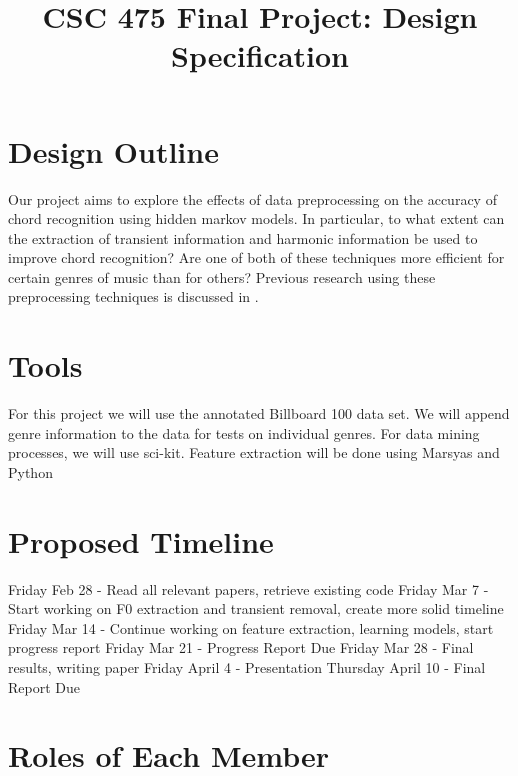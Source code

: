 \documentclass{article}
\title{CSC 475 Final Project: Design Specification}
\begin{document}
%
\maketitle
%

\section{Design Outline}\label{sec:desoutline}
Our project aims to explore the effects of data preprocessing on the accuracy
of chord recognition using hidden markov models. In particular, to what extent
can the extraction of transient information and harmonic information be used to
improve chord recognition? Are one of both of these techniques more efficient
for certain genres of music than for others? Previous research using these
preprocessing techniques is discussed in \cite{McVicar:00}.

\section{Tools}\label{sec:tools}

For this project we will use the annotated Billboard 100 data set. We will
append genre information to the data for tests on individual genres. For data
mining processes, we will use sci-kit. Feature extraction will be done using
Marsyas and Python

\section{Proposed Timeline}\label{sec:timeline}

Friday Feb 28 - Read all relevant papers, retrieve existing code \newline
Friday Mar 7 - Start working on F0 extraction and transient removal, create
more solid timeline \newline Friday Mar 14 - Continue working on feature
extraction, learning models, start progress report \newline Friday Mar 21 -
Progress Report Due \newline Friday Mar 28 - Final results, writing paper
\newline Friday April 4 - Presentation \newline Thursday April 10 - Final
Report Due

\section{Roles of Each Member}
\end{document}
